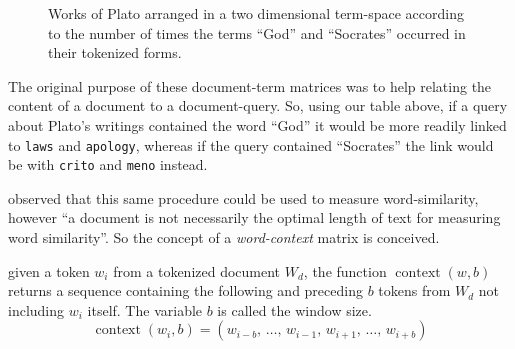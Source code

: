 \par
\begin{figure}[H]
  \captionsetup{width=.91\linewidth}
  \begin{center}
    \caption{Works of Plato arranged in a two dimensional term-space according to the number of times the terms ``God'' and ``Socrates'' occurred in their tokenized forms.}\label{fig:plato-docs}
  \end{center}
\end{figure}
\vspace{-1.8em}
\noindent
The original purpose of these document-term matrices was to help relating the content of a document to a document-query. So, using our table above, if a query about Plato's writings contained the word ``God'' it would be more readily linked to \texttt{laws} and \texttt{apology}, whereas if the query contained ``Socrates'' the link would be with \texttt{crito} and \texttt{meno} instead.

\textcite{deerwester-1990-indexing-by-lsa} observed that this same procedure could be used to measure word-similarity, however ``a document is not necessarily the optimal length of text for measuring word similarity''. So the concept of a \emph{word-context} matrix is conceived.

\begin{definition}
  given a token $w_i$ from a tokenized document $W_d$, the function $\operatorname{context}(w, b)$ returns a sequence containing the following and preceding $b$ tokens from $W_d$ not including $w_i$ itself. The variable $b$ is called the window size.
  \begin{equation}
    \operatorname{context}(w_i,b)=(w_{i-b},\,\dots,\,w_{i-1},\,w_{i+1},\,\dots,\,w_{i+b})
  \end{equation}
\end{definition}

